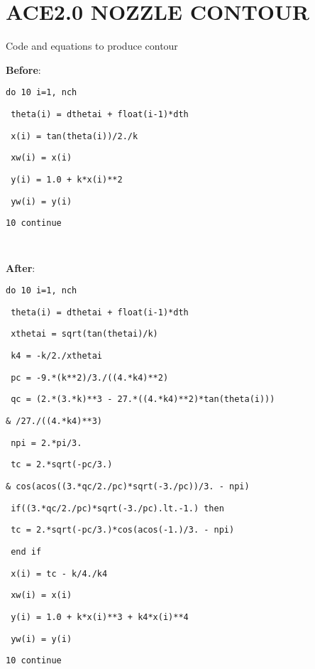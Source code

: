 %
%	 
%



\chapter{ACE2.0 NOZZLE CONTOUR}
\label{appendix:contour}

Code and equations to produce contour

\begin{singlespace}
    \textbf{Before}:

    \texttt{do 10 i=1, nch}

    \texttt{\; theta(i) = dthetai + float(i-1)*dth}

    \texttt{\; x(i) = tan(theta(i))/2./k}

    \texttt{\; xw(i) = x(i)}

    \texttt{\; y(i) = 1.0 + k*x(i)**2}

    \texttt{\; yw(i) = y(i)}

    \texttt{10 continue}

    \texttt{ }
    
    \textbf{After}:

    \texttt{do 10 i=1, nch }

    \texttt{\; theta(i) = dthetai + float(i-1)*dth}

    \texttt{\; xthetai = sqrt(tan(thetai)/k)}

    \texttt{\; k4 = -k/2./xthetai}

    \texttt{\; pc = -9.*(k**2)/3./((4.*k4)**2)}

    \texttt{\; qc = (2.*(3.*k)**3 - 27.*((4.*k4)**2)*tan(theta(i)))}

    \texttt{\& \quad /27./((4.*k4)**3)}

    \texttt{\; npi = 2.*pi/3.}

    \texttt{\; tc = 2.*sqrt(-pc/3.)}

    \texttt{\& \quad *cos(acos((3.*qc/2./pc)*sqrt(-3./pc))/3. - npi)}

    \texttt{\; if((3.*qc/2./pc)*sqrt(-3./pc).lt.-1.) then}

    \texttt{\; \qquad tc = 2.*sqrt(-pc/3.)*cos(acos(-1.)/3. - npi)}

    \texttt{\; end if}

    \texttt{\; x(i) = tc - k/4./k4}

    \texttt{\; xw(i) = x(i)}

    \texttt{\; y(i) = 1.0 + k*x(i)**3 + k4*x(i)**4}

    \texttt{\; yw(i) = y(i)}

    \texttt{10 continue}
\end{singlespace}

